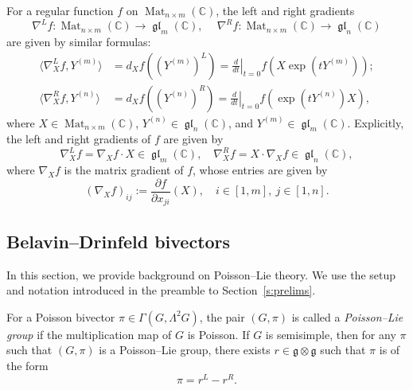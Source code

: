 \documentclass[11pt]{article}
\DeclareMathOperator{\gl}{\mathfrak{gl}}
\DeclareMathOperator{\Mat}{Mat}
\theoremstyle{definition}\newtheorem{definition}[theorem]{Definition}
\theoremstyle{definition}\newtheorem{remark}[theorem]{Remark}
\theoremstyle{remark}
\numberwithin{equation}{section}
\begin{document}
For a regular function $f$ on $\Mat_{n\times m}(\mathbb{C})$, the left and right gradients
\begin{equation*}
    \nabla^L f : \Mat_{n \times m}(\mathbb{C}) \rightarrow \gl_m(\mathbb{C}), \quad \ \nabla^R f: \Mat_{n\times m}(\mathbb{C})\rightarrow \gl_n(\mathbb{C})
\end{equation*}
are given by similar formulas:
\begin{align*}
    \langle \nabla^L_Xf,Y^{(m)}\rangle  &= d_Xf((Y^{(m)})^L) = \left.\frac{d}{dt}\right|_{t=0} f(X \exp(t Y^{(m)}));\\
    \langle \nabla^R_X f,Y^{(n)}\rangle &= d_Xf((Y^{(n)})^R) = \left.\frac{d}{dt}\right|_{t=0} f(\exp(t Y^{(n)})X),
\end{align*}
where $X\in \Mat_{n\times m}(\mathbb{C})$,  $Y^{(n)} \in \gl_n(\mathbb{C})$, and $Y^{(m)} \in  \gl_m(\mathbb{C})$. Explicitly, the left and right gradients of $f$ are given by
\begin{equation*}
    \nabla^L_X f = \nabla_X f \cdot X \in \gl_m(\mathbb{C}), \quad \nabla^R_X f = X \cdot \nabla_X f \in \gl_n(\mathbb{C}),
\end{equation*}
where $\nabla_X f$ is the matrix gradient of $f$, whose entries are given by
\begin{equation*}
    (\nabla_X f)_{ij} := \frac{\partial f}{\partial x_{ji}}(X), \quad i \in [1,m], \ j \in [1,n].
\end{equation*}

\subsection{Belavin--Drinfeld bivectors}\label{s:bd_background}
In this section, we provide background on Poisson--Lie theory. We use the setup and notation introduced in the preamble to Section~\ref{s:prelims}.

For a Poisson bivector $\pi \in \Gamma(G,\Lambda^2 G)$, the pair $(G,\pi)$ is called a \emph{Poisson--Lie group} if the multiplication map of $G$ is Poisson. If $G$ is semisimple, then for any $\pi$ such that $(G,\pi)$ is a Poisson--Lie group, there exists $r \in \mathfrak{g}\otimes \mathfrak{g}$ such that $\pi$ is of the form
\begin{equation*}
    \pi = r^L - r^R.
\end{equation*}
\end{document}
